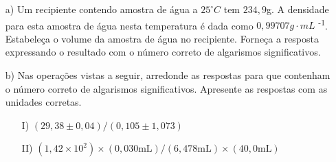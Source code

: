 \documentclass[a4paper, 12pt]{article}
\begin{document}
\begin{enumerate}
          \begin{enumerate}
              \item[a)] Um recipiente contendo amostra de água a \( 25^\circ C \) tem \( 234,9 \)g. A densidade para esta amostra de água nesta temperatura é dada como \( 0,99707g \cdot mL\) \textsuperscript{-1}. Estabeleça o volume da amostra de água no recipiente. Forneça a resposta expressando o resultado com o número correto de algarismos significativos.
              \item[b)] Nas operações vistas a seguir, arredonde as respostas para que contenham o número correto de algarismos significativos. Apresente as respostas com as unidades corretas.
                    \begin{enumerate}
                        \item[I)] \( (29,38 \pm 0,04) / (0,105 \pm 1,073) \)
                        \item[II)] \( (1,42 \times 10^2) \times (0,030 \text{mL}) / (6,478 \text{mL}) \times (40,0 \text{mL}) \)
                    \end{enumerate}
          \end{enumerate}
\end{enumerate}
\end{document}
